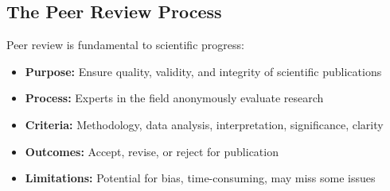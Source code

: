     \centering

\subsection{The Peer Review Process}

Peer review is fundamental to scientific progress:
\begin{itemize}
    \item \textbf{Purpose:} Ensure quality, validity, and integrity of scientific publications
    \item \textbf{Process:} Experts in the field anonymously evaluate research
    \item \textbf{Criteria:} Methodology, data analysis, interpretation, significance, clarity
    \item \textbf{Outcomes:} Accept, revise, or reject for publication
    \item \textbf{Limitations:} Potential for bias, time-consuming, may miss some issues
\end{itemize}


